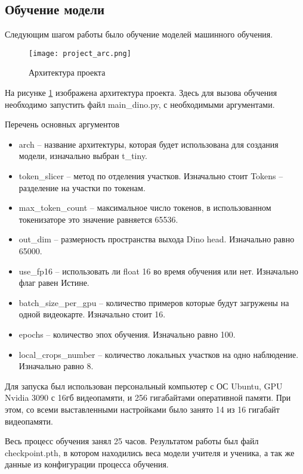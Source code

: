 \documentclass[../part_3.tex]{subfiles}
\begin{document}
\subsection{Обучение модели}
\par Следующим шагом работы было обучение моделей машинного обучения. 
\begin{figure}[H]
    \centering
    \texttt{[image: project\_arc.png]}
    \caption{Архитектура проекта}
    \label{fig:project_arc}
\end{figure}
\par На рисунке \ref{fig:project_arc} изображена архитектура проекта. Здесь для вызова обучения необходимо запустить файл main\_dino.py, с необходимыми аргументами.
\par Перечень основных аргументов
\begin{itemize}
    \item arch -- название архитектуры, которая будет использована для создания модели, изначально выбран t\_tiny.
    \item token\_slicer -- метод по отделения участков. Изначально стоит Tokens -- разделение на участки по токенам.
    \item max\_token\_count -- максимальное число токенов, в использованном токенизаторе это значение равняется 65536.
    \item out\_dim -- размерность пространства выхода Dino head. Изначально равно 65000.
    \item use\_fp16 -- использовать ли float 16 во время обучения или нет. Изначально флаг равен Истине.
    \item batch\_size\_per\_gpu -- количество примеров которые будут загружены на одной видеокарте. Изначально стоит 16.
    \item epochs -- количество эпох обучения. Изначально равно 100.
    \item local\_crops\_number -- количество локальных участков на одно наблюдение. Изначально равно 8.
\end{itemize}
\par Для запуска был использован персональный компьютер с ОС Ubuntu, GPU Nvidia 3090 с 16гб видеопамяти, и 256 гигабайтами оперативной памяти. При этом, со всеми выставленными настройками было занято 14 из 16 гигабайт видеопамяти.
\par Весь процесс обучения занял 25 часов. Результатом работы был файл checkpoint.pth, в котором находились веса модели учителя и ученика, а так же данные из конфигурации процесса обучения.
\end{document}
